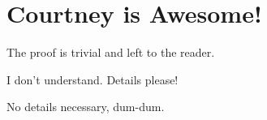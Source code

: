 \documentclass{amsart}
\begin{document}
\section{Courtney is Awesome!}

The proof is trivial and left to the reader.

I don't understand. Details please!

No details necessary, dum-dum.
\end{document}
